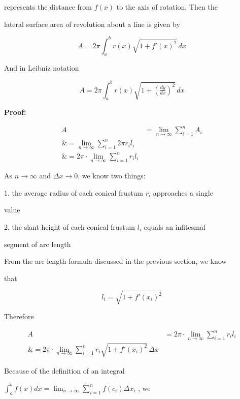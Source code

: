 represents the distance from $f(x)$ to the axis of rotation. Then the

lateral surface area of revolution about a line is given by



$$A = 2\pi\int _a^b r(x) \sqrt{1+f'(x)^2} \, dx$$



And in Leibniz notation



$$A=2\pi\int _a^b r(x) \sqrt{1 + \left(\tfrac{dy}{dx}\right)^2}\,dx$$



\textbf{Proof:}



\begin{align}
A &= \lim _{n\to\infty}\sum _{i=1}^n A _i \\\&= \lim _{n\to\infty}\sum _{i=1}^n 2\pi r _i l _i \\\&= 2\pi\cdot\lim _{n\to\infty}\sum _{i=1}^n r _i l _i
\end{align}



As $n\to\infty$ and $\Delta x\to 0$, we know two things:



1.  the average radius of each conical frustum $r _i$ approaches a single

    value

2.  the slant height of each conical frustum $l _i$ equals an infitesmal

    segment of arc length



From the arc length formula discussed in the previous section, we know

that



$$l _i=\sqrt{1+f'(x _i)^2}$$



Therefore



\begin{align}
A &= 2\pi\cdot\lim _{n\to\infty}\sum _{i=1}^n r _i l _i \\\&= 2\pi\cdot\lim _{n\to\infty}\sum _{i=1}^n r _i\sqrt{1 + f'(x _i)^2}\,\Delta x
\end{align}



Because of the definition of an integral

$\int _a^b f(x)dx=\lim _{n\to\infty}\sum _{i=1}^n f(c _i)\Delta x _i$ , we

